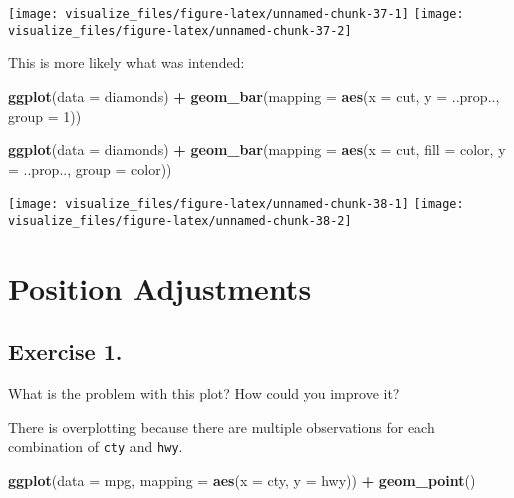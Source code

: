 \documentclass[]{book}
\newenvironment{Shaded}{\begin{snugshade}}{\end{snugshade}}
\newcommand{\DataTypeTok}[1]{\textcolor[rgb]{0.13,0.29,0.53}{#1}}
\newcommand{\DecValTok}[1]{\textcolor[rgb]{0.00,0.00,0.81}{#1}}
\newcommand{\KeywordTok}[1]{\textcolor[rgb]{0.13,0.29,0.53}{\textbf{#1}}}
\newcommand{\NormalTok}[1]{#1}
\newcommand{\OperatorTok}[1]{\textcolor[rgb]{0.81,0.36,0.00}{\textbf{#1}}}
\newcommand{\StringTok}[1]{\textcolor[rgb]{0.31,0.60,0.02}{#1}}
\theoremstyle{definition}
\theoremstyle{definition}
\theoremstyle{definition}
\theoremstyle{remark}
\begin{document}
\begin{center}\texttt{[image: visualize\_files/figure-latex/unnamed-chunk-37-1]} \texttt{[image: visualize\_files/figure-latex/unnamed-chunk-37-2]} \end{center}

This is more likely what was intended:

\begin{Shaded}
\begin{Highlighting}[]
\KeywordTok{ggplot}\NormalTok{(}\DataTypeTok{data =}\NormalTok{ diamonds) }\OperatorTok{+}\StringTok{ }
\StringTok{  }\KeywordTok{geom_bar}\NormalTok{(}\DataTypeTok{mapping =} \KeywordTok{aes}\NormalTok{(}\DataTypeTok{x =}\NormalTok{ cut, }\DataTypeTok{y =}\NormalTok{ ..prop.., }\DataTypeTok{group =} \DecValTok{1}\NormalTok{))}

\KeywordTok{ggplot}\NormalTok{(}\DataTypeTok{data =}\NormalTok{ diamonds) }\OperatorTok{+}\StringTok{ }
\StringTok{  }\KeywordTok{geom_bar}\NormalTok{(}\DataTypeTok{mapping =} \KeywordTok{aes}\NormalTok{(}\DataTypeTok{x =}\NormalTok{ cut, }\DataTypeTok{fill =}\NormalTok{ color, }\DataTypeTok{y =}\NormalTok{ ..prop.., }\DataTypeTok{group =}\NormalTok{ color))}
\end{Highlighting}
\end{Shaded}

\begin{center}\texttt{[image: visualize\_files/figure-latex/unnamed-chunk-38-1]} \texttt{[image: visualize\_files/figure-latex/unnamed-chunk-38-2]} \end{center}

\hypertarget{position-adjustments}{%
\section{Position Adjustments}\label{position-adjustments}}

\hypertarget{exercise-1.-5}{%
\subsection{Exercise 1.}\label{exercise-1.-5}}

What is the problem with this plot? How could you improve it?

There is overplotting because there are multiple observations for each
combination of \texttt{cty} and \texttt{hwy}.

\begin{Shaded}
\begin{Highlighting}[]
\KeywordTok{ggplot}\NormalTok{(}\DataTypeTok{data =}\NormalTok{ mpg, }\DataTypeTok{mapping =} \KeywordTok{aes}\NormalTok{(}\DataTypeTok{x =}\NormalTok{ cty, }\DataTypeTok{y =}\NormalTok{ hwy)) }\OperatorTok{+}\StringTok{ }
\StringTok{  }\KeywordTok{geom_point}\NormalTok{()}
\end{Highlighting}
\end{Shaded}
\end{document}
